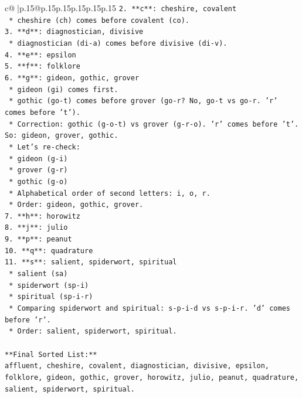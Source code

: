 \documentclass{article}
\begin{document}
{\begin{supertabular}{c@{$\;$}|p{.15\linewidth}@{}p{.15\linewidth}p{.15\linewidth}p{.15\linewidth}p{.15\linewidth}p{.15\linewidth}}
{{{\texttt{2.  **c**: cheshire, covalent} \\
\texttt{    *   cheshire (ch) comes before covalent (co).} \\
\texttt{3.  **d**: diagnostician, divisive} \\
\texttt{    *   diagnostician (di{-}a) comes before divisive (di{-}v).} \\
\texttt{4.  **e**: epsilon} \\
\texttt{5.  **f**: folklore} \\
\texttt{6.  **g**: gideon, gothic, grover} \\
\texttt{    *   gideon (gi) comes first.} \\
\texttt{    *   gothic (go{-}t) comes before grover (go{-}r? No, go{-}t vs go{-}r. 'r' comes before 't').} \\
\texttt{    *   Correction: gothic (g{-}o{-}t) vs grover (g{-}r{-}o). 'r' comes before 't'. So: gideon, grover, gothic.} \\
\texttt{    *   Let's re{-}check:} \\
\texttt{        *   gideon (g{-}i)} \\
\texttt{        *   grover (g{-}r)} \\
\texttt{        *   gothic (g{-}o)} \\
\texttt{    *   Alphabetical order of second letters: i, o, r.} \\
\texttt{    *   Order: gideon, gothic, grover.} \\
\texttt{7.  **h**: horowitz} \\
\texttt{8.  **j**: julio} \\
\texttt{9.  **p**: peanut} \\
\texttt{10. **q**: quadrature} \\
\texttt{11. **s**: salient, spiderwort, spiritual} \\
\texttt{    *   salient (sa)} \\
\texttt{    *   spiderwort (sp{-}i)} \\
\texttt{    *   spiritual (sp{-}i{-}r)} \\
\texttt{    *   Comparing spiderwort and spiritual: s{-}p{-}i{-}d vs s{-}p{-}i{-}r. 'd' comes before 'r'.} \\
\texttt{    *   Order: salient, spiderwort, spiritual.} \\
\\ 
\texttt{**Final Sorted List:**} \\
\texttt{affluent, cheshire, covalent, diagnostician, divisive, epsilon, folklore, gideon, gothic, grover, horowitz, julio, peanut, quadrature, salient, spiderwort, spiritual.} \\
}}}
\end{supertabular}}
\end{document}
